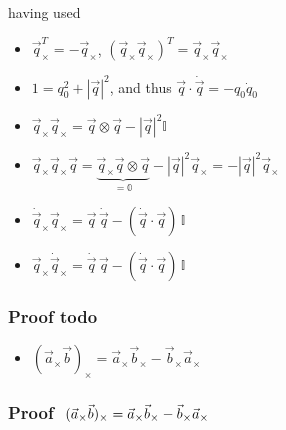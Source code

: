 \documentclass[letterpaper,10pt,english]{jupyterBook}
\begin{document}
\sphinxAtStartPar
having used
\begin{itemize}
\item {} 
\sphinxAtStartPar
\(\vec{q}_\times^T = - \vec{q}_\times\), \(\left( \vec{q}_\times \vec{q}_\times \right)^T = \vec{q}_\times \vec{q}_\times\)

\item {} 
\sphinxAtStartPar
\(1 = q_0^2 + |\vec{q}|^2\), and thus \(\vec{q} \cdot \dot{\vec{q}} = - q_0 \dot{q}_0\)

\item {} 
\sphinxAtStartPar
\(\vec{q}_\times \vec{q}_\times = \vec{q} \otimes \vec{q} - |\vec{q}|^2 \mathbb{I}\)

\item {} 
\sphinxAtStartPar
\(\vec{q}_\times \vec{q}_\times \vec{q} = \underbrace{\vec{q}_\times \vec{q} \otimes \vec{q}}_{=\mathbb{0}} - |\vec{q}|^2 \vec{q}_{\times} = -|\vec{q}|^2 \vec{q}_{\times} \)

\item {} 
\sphinxAtStartPar
\(\dot{\vec{q}}_\times \vec{q}_\times = \vec{q} \, \dot{\vec{q}} - \left( \dot{\vec{q}} \cdot \vec{q} \right) \, \mathbb{I}\)

\item {} 
\sphinxAtStartPar
\(\vec{q}_\times \dot{\vec{q}}_\times = \dot{\vec{q}} \, \vec{q} - \left( \dot{\vec{q}} \cdot \vec{q} \right) \, \mathbb{I}\)

\end{itemize}
\subsubsection*{Proof \sphinxhyphen{} todo}
\begin{itemize}
\item {} 
\sphinxAtStartPar
\((\vec{a}_\times \vec{b})_{\times} = \vec{a}_{\times} \vec{b}_\times - \vec{b}_\times \vec{a}_\times \)

\end{itemize}
\subsubsection*{Proof \protect\(\ (\vec{a}_\times \vec{b})_{\times} = \vec{a}_{\times} \vec{b}_\times - \vec{b}_\times \vec{a}_\times \protect\)}
\end{document}
